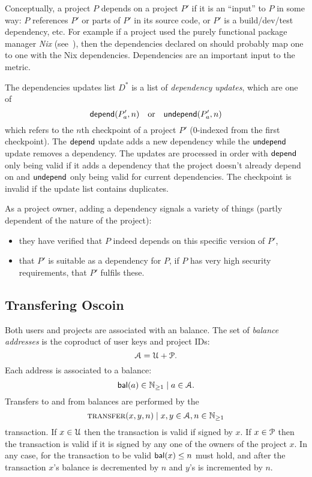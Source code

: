 \label{s:dependencies}
Conceptually, a project $P$ depends on a project $P'$ if it is an
``input'' to $P$ in some way: $P$ references $P'$ or parts of
$P'$ in its source code, or $P'$ is a build/dev/test dependency,
etc. For example if a project used the purely functional package
manager \emph{Nix} (see~\cite{nix}), then the dependencies declared on
\oscoin{} should probably map one to one with the Nix
dependencies. Dependencies are an important input to the \osrank{}
metric.

The dependencies updates list $D^*$ is a list of \emph{dependency
  updates}, which are one of
\[
    \mathsf{depend}(P'_a, n) \quad \text{or} \quad \mathsf{undepend}(P'_a, n)
\]
which refers to the $n$th checkpoint of a project $P'$ ($0$-indexed
from the first checkpoint). The $\mathsf{depend}$ update adds a new dependency
while the $\mathsf{undepend}$ update removes a dependency. The updates are
processed in order with $\mathsf{depend}$ only being valid if it adds a
dependency that the project doesn't already depend on and $\mathsf{undepend}$
only being valid for current dependencies. The checkpoint is invalid
if the update list contains duplicates.

As a project owner, adding a dependency signals a variety of things
(partly dependent of the nature of the project):
\begin{itemize}
\item they have verified that $P$ indeed depends on this specific
  version of $P'$,
\item that $P'$ is suitable as a dependency for $P$, \eg{} if $P$ has
  very high security requirements, that $P'$ fulfils these.
\end{itemize}


\def\posnat{\mathbb{N}_{\geq 1}}

\subsection{Transfering Oscoin}

Both users and projects are associated with an \oscoin{} balance.  The
set of \emph{balance addresses} is the coproduct of user keys and
project IDs:
\[
\mathcal{A} = \mathcal{U} + \mathcal{P}.
\]
Each address is associated to a balance:
\[
\bal(a) \in \posnat \mid a \in \accAddrs.
\]
Transfers to and from balances are performed by the
\[
\text{\normalfont\scshape transfer}\small{\lparen x,y,n\rparen} \mid x,y \in \mathcal{A}, n \in \mathbb{N}_{\geq 1}
\]
transaction. If $x \in \mathcal{U}$ then the transaction is valid if signed
by $x$. If $x \in \mathcal{P}$ then the transaction is valid if it is
signed by any one of the owners of the project $x$. In any case, for
the transaction to be valid $\mathsf{bal}(x) \leq n$ must hold, and after the
transaction $x$'s balance is decremented by $n$ and $y$'s is
incremented by $n$.

